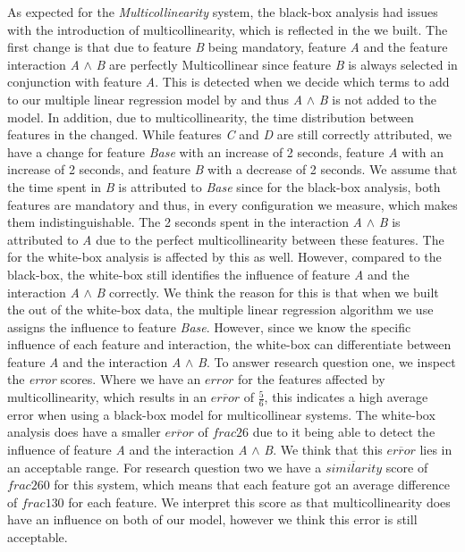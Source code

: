 As expected for the \emph{Multicollinearity} system, the black-box analysis had issues with the introduction of multicollinearity, 
which is reflected in the {\perfInfluenceModel} we built.
The first change is that due to feature \emph{B} being mandatory, 
feature \emph{A} and the feature interaction \emph{A} $\land$ \emph{B} are perfectly Multicollinear since feature \emph{B} 
is always selected in conjunction with feature \emph{A}. 
This is detected when we decide which terms to add to our multiple linear regression model by  
and thus \emph{A} $\land$ \emph{B} is not added to the model. In addition, due to multicollinearity, the time distribution between features in the 
{\perfInfluenceModel} changed. While features \emph{C} and \emph{D} are still correctly attributed, 
we have a change for feature \emph{Base} with an increase of 2 seconds, feature \emph{A} with an increase of 2 seconds, 
and feature \emph{B} with a decrease of 2 seconds.
We assume that the time spent in \emph{B} is attributed to \emph{Base} since for the black-box analysis, both features are mandatory and
thus, in every configuration we measure, which makes them indistinguishable. 
The 2 seconds spent in the interaction \emph{A} $\land$ \emph{B} is attributed to \emph{A} due to the perfect multicollinearity 
between these features. 
The {\perfInfluenceModel} for the white-box analysis is affected by this as well. 
However, compared to the black-box, the white-box still identifies the influence of feature \emph{A} and the interaction
\emph{A} $\land$ \emph{B} correctly. We think the reason for this is that when we built the {\perfInfluenceModel} out of the white-box data,
the multiple linear regression algorithm we use assigns the influence to feature \emph{Base}.
However, since we know the specific influence of each feature and interaction,
the white-box can differentiate between feature \emph{A} and the interaction \emph{A} $\land$ \emph{B}.
To answer research question one, we inspect the \emph{error} scores. Where we have an $error$ for the features affected by multicollinearity,  
which results in an $\overline{error}$ of $\frac{5}{6}$, this indicates a high average error when using a black-box model for multicollinear systems. 
The white-box analysis does have a smaller $\overline{error}$ of $frac{2}{6}$ due to it being able to detect the influence of feature \emph{A} 
and the interaction \emph{A} $\land$ \emph{B}. We think that this $\overline{error}$ lies in an acceptable range.
For research question two we have a $\overline{similarity}$ score of $frac{2}{60}$ for this system, 
which means that each feature got an average 
difference of $frac{1}{30}$ for each feature. We interpret this score as that multicollinearity does have an influence
on both of our model, however we think this error is still acceptable.


